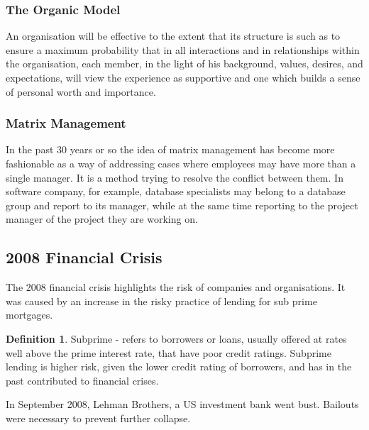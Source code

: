 \documentclass[a4paper]{article}
\theoremstyle{plain}
\theoremstyle{definition}
\newtheorem{defn}{Definition}[section]
\theoremstyle{remark}
\begin{document}
\subsubsection{The Organic Model}
An organisation will be effective to the extent that its structure is such as to ensure a maximum probability that in all interactions and in relationships within the organisation, each member, in the light of his background, values, desires, and expectations, will view the experience as supportive and one which builds a sense of personal worth and importance.
\subsubsection{Matrix Management}
In the past 30 years or so the idea of matrix management has become more fashionable as a way of addressing cases where employees may have more than a single manager. It is a method trying to resolve the conflict between them. In software company, for example, database specialists may belong to a database group and report to its manager, while at the same time reporting to the project manager of the project they are working on. 

\subsection{2008 Financial Crisis}
The 2008 financial crisis highlights the risk of companies and organisations. It was caused by an increase in the risky practice of lending for sub prime mortgages.
\begin{defn}
	Subprime - refers to borrowers or loans, usually offered at rates well above the prime interest rate, that have poor credit ratings. Subprime lending is higher risk, given the lower credit rating of borrowers, and has in the past contributed to financial crises.
\end{defn}
In September 2008, Lehman Brothers, a US investment bank went bust. Bailouts were necessary to prevent further collapse.
\end{document}
